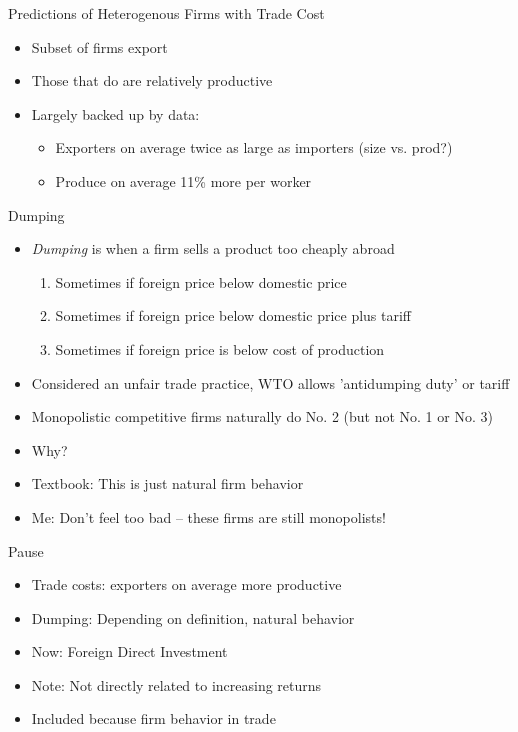 \documentclass{beamer}
\begin{document}
\begin{frame}{Predictions of Heterogenous Firms with Trade Cost}
    \begin{itemize}
        \item Subset of firms export
        \item Those that do are relatively productive
        \item Largely backed up by data:
        \begin{itemize}
            \item Exporters on average twice as large as importers (size vs. prod?)
            \item Produce on average 11\% more per worker
        \end{itemize}
    \end{itemize}
\end{frame}

\begin{frame}{Dumping}
    \begin{itemize}
        \item \emph{Dumping} is when a firm sells a product too cheaply abroad
        \begin{enumerate}
            \item Sometimes if foreign price below domestic price 
            \item Sometimes if foreign price below domestic price plus tariff
            \item Sometimes if foreign price is below cost of production
        \end{enumerate}
        \item Considered an unfair trade practice, WTO allows 'antidumping duty' or tariff
        \item Monopolistic competitive firms naturally do No. 2 (but not No. 1 or No. 3)
        \item Why?
        \item Textbook: This is just natural firm behavior 
        \item Me: Don't feel too bad -- these firms are still monopolists!
    \end{itemize}
\end{frame}

\begin{frame}{Pause}

    \begin{itemize}
        \item Trade costs: exporters on average more productive
        \item Dumping: Depending on definition, natural behavior
        \item Now: Foreign Direct Investment
        \item Note: Not directly related to increasing returns
        \item Included because firm behavior in trade
    \end{itemize}

\end{frame}
\end{document}
